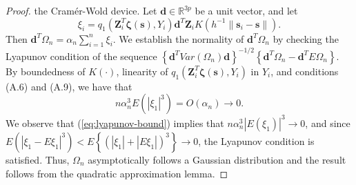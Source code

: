 \documentclass[authoryear,review, 12pt]{elsarticle}
\begin{document}
\begin{proof}
the Cram\'{e}r-Wold device. Let $\bm{d}\in\mathbb{R}^{3p}$ be a
unit vector, and let
\[
\xi_{i}=q_{1}\left(\bm{Z}_{i}^{T}\bm{\zeta}(\bm{s}),Y_{i}\right)\bm{d}^{T}\bm{Z}_{i}K\left(h^{-1}\|\bm{s}_{i}-\bm{s}\|\right).
\]
Then $\bm{d}^{T}\Omega_{n}=\alpha_{n}\sum_{i=1}^{n}\xi_{i}$. We establish
the normality of $\bm{d}^{T}\Omega_{n}$ by checking the Lyapunov
condition of the sequence $\left\{ \bm{d}^{T}Var\left(\Omega_{n}\right)\bm{d}\right\} ^{-1/2}\left\{ \bm{d}^{T}\Omega_{n}-\bm{d}^{T}E\Omega_{n}\right\} $.
By boundedness of $K\left(\cdot\right)$, linearity of $q_{1}\left(\bm{Z}_{i}^{T}\bm{\zeta}(\bm{s}),Y_{i}\right)$
in $Y_{i}$, and conditions (A.6) and (A.9), we have that
\begin{equation}
n\alpha_{n}^{3}E\left(\left|\xi_{1}\right|^{3}\right)=O\left(\alpha_{n}\right)\to0.\label{eq:lyapunov-bound}
\end{equation}
We observe that (\ref{eq:lyapunov-bound}) implies that $n\alpha_{n}^{3}\left|E\left(\xi_{1}\right)\right|^{3}\to0$,
and since $E\left(\left|\xi_{1}-E\xi_{1}\right|^{3}\right)<E\left\{ \left(\left|\xi_{1}\right|+\left|E\xi_{1}\right|\right)^{3}\right\} \to0$,
the Lyapunov condition is satisfied. Thus, $\Omega_{n}$ asymptotically
follows a Gaussian distribution and the result follows from the quadratic
approximation lemma.
\end{proof}
\end{document}

